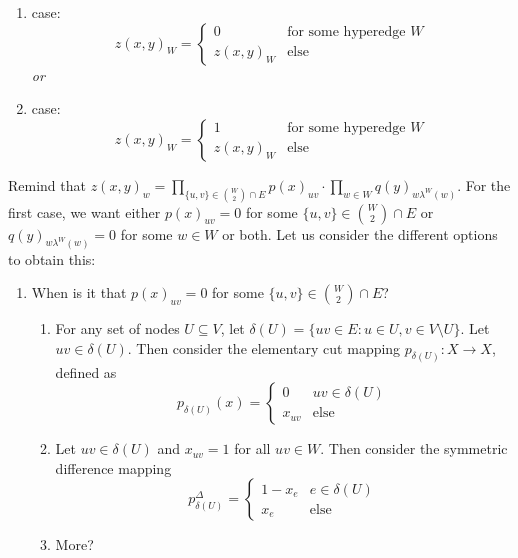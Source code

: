 \begin{enumerate}
    \item case: \begin{equation}
        z(x,y)_W=  \begin{cases}
        0 & \text{for some hyperedge } W \\
        z(x,y)_W & \text{else}
        \end{cases} 
    \end{equation}
    \textit{or}
    \item case: \begin{equation}
        z(x,y)_W=  \begin{cases}
        1 & \text{for some hyperedge } W \\
        z(x,y)_W & \text{else}
        \end{cases}
    \end{equation}
\end{enumerate} Remind that $z(x,y)_w= \prod_{\{u,v\} \in \binom{W}{2} \cap E} p(x)_{uv} \cdot \prod_{w \in W} q(y)_{w \lambda^W(w)}$. For the first case, we want either $p(x)_{uv}=0$ for some $\{u,v\} \in \binom{W}{2} \cap E$ or $q(y)_{w \lambda^W(w)}=0$ for some $w\in W$ or both. Let us consider the different options to obtain this: \begin{enumerate}
\item When is it that $p(x)_{uv}=0$ for some $\{u,v\} \in \binom{W}{2} \cap E$? 
\begin{enumerate}
    \item For any set of nodes $U \subseteq V$, let $\delta(U)=\{uv \in E: u \in U, v \in V \setminus U \}$. Let $uv \in \delta(U)$. Then consider the elementary cut mapping $p_{\delta(U)}: X \rightarrow X$, defined as \begin{equation*}
    p_{\delta(U)}(x) = 
    \begin{cases}
    0 & uv \in \delta(U)\\
    x_{uv} & \text{else}
    \end{cases}
    \end{equation*}
    \item Let  $uv \in \delta(U)$ and $x_{uv}=1$ for all $uv \in W$. Then consider the symmetric difference mapping \[ p^{\Delta}_{\delta(U)} = \begin{cases}
    1-x_e & e \in \delta(U) \\
    x_e & \text{else} 
    \end{cases} \]
    \item More? 
\end{enumerate}

\end{enumerate}
